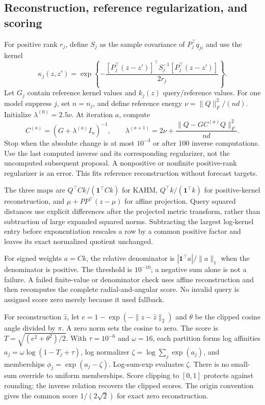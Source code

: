 \subsection{Reconstruction, reference regularization, and scoring}
For positive rank $r_j$, define $S_j$ as the sample covariance of $P_j^\top q_{ji}$ and use the kernel
\[
 \kappa_j(z,z')=\exp\left\{-\frac{[P_j^\top(z-z')]^\top S_j^{-1}[P_j^\top(z-z')]}{2r_j}\right\}.
\]
Let $G_j$ contain reference kernel values and $k_j(z)$ query/reference values. For one model suppress $j$, set $n=n_j$, and define reference energy $\nu=\|Q\|_F^2/(nd)$. Initialize $\lambda^{(0)}=2.5\nu$. At iteration $a$, compute
\[
 C^{(a)}=(G+\lambda^{(a)}I_n)^{-1},\qquad
 \lambda^{(a+1)}=2\nu+\frac{\|Q-GC^{(a)}Q\|_F^2}{nd}.
\]
Stop when the absolute change is at most $10^{-3}$ or after 100 inverse computations. Use the last computed inverse and its corresponding regularizer, not the uncomputed subsequent proposal. A nonpositive or nonfinite positive-rank regularizer is an error. This fits reference reconstruction without forecast targets.

The three maps are $Q^\top Ck/(\mathbf1^\top Ck)$ for KAHM, $Q^\top k/(\mathbf1^\top k)$ for positive-kernel reconstruction, and $\mu+PP^\top(z-\mu)$ for affine projection. Query squared distances use explicit differences after the projected metric transform, rather than subtraction of large expanded squared norms. Subtracting the largest log-kernel entry before exponentiation rescales a row by a common positive factor and leaves its exact normalized quotient unchanged.

For signed weights $a=Ck$, the relative denominator is $|\mathbf1^\top a|/\|a\|_1$ when the denominator is positive. The threshold is $10^{-10}$; a negative sum alone is not a failure. A failed finite-value or denominator check uses affine reconstruction and then recomputes the complete radial-and-angular score. No invalid query is assigned score zero merely because it used fallback.

For reconstruction $\widehat z$, let $e=1-\exp(-\|z-\widehat z\|_2)$ and $\theta$ be the clipped cosine angle divided by $\pi$. A zero norm sets the cosine to zero. The score is $T=\sqrt{(e^2+\theta^2)/2}$. With $\tau=10^{-6}$ and $\omega=16$, each partition forms log affinities $a_j=\omega\log(1-T_j+\tau)$, log normalizer $\zeta=\log\sum_j\exp(a_j)$, and memberships $\phi_j=\exp(a_j-\zeta)$. Log-sum-exp evaluates $\zeta$. There is no small-sum override to uniform memberships. Score clipping to $[0,1]$ protects against rounding; the inverse relation recovers the clipped scores. The origin convention gives the common score $1/(2\sqrt2)$ for exact zero reconstruction.

